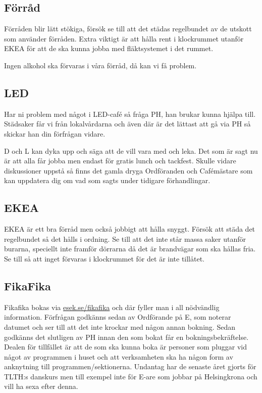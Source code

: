 \documentclass[10pt]{article}
\begin{document}
    \subsection{Förråd}
    
    Förråden blir lätt stökiga, försök se till att det städas regelbundet av de utskott som använder förråden. Extra viktigt är att hålla rent i klockrummet utanför EKEA för att de ska kunna jobba med fläktsystemet i det rummet.
    
    Ingen alkohol ska förvaras i våra förråd, då kan vi få problem.

    \subsection{LED}
    
    Har ni problem med något i LED-café så fråga PH, han brukar kunna hjälpa till. Städsaker får vi från lokalvårdarna och även där är det lättast att gå via PH så skickar han din förfrågan vidare.
    
    D och L kan dyka upp och säga att de vill vara med och leka. Det som är sagt nu är att alla får jobba men endast för gratis lunch och tackfest. Skulle vidare diskussioner uppstå så finns det gamla dryga Ordföranden och Cafémästare som kan uppdatera dig om vad som sagts under tidigare förhandlingar.
    
    \subsection{EKEA}
    
    EKEA är ett bra förråd men också jobbigt att hålla snyggt. Försök att städa det regelbundet så det hålls i ordning. Se till att det inte står massa saker utanför burarna, speciellt inte framför dörrarna då det är brandvägar som ska hållas fria. Se till så att inget förvaras i klockrummet för det är inte tillåtet.
    
    \subsection{FikaFika}
    
    Fikafika bokas via \url{esek.se/fikafika} och där fyller man i all nödvändlig information. Förfrågan godkänns sedan av Ordförande på E, som noterar datumet och ser till att det inte krockar med någon annan bokning. Sedan godkänns det slutligen av PH innan den som bokat får en bokningsbekräftelse. Dealen för tillfället är att de som ska kunna boka är personer som pluggar vid något av programmen i huset och att verksamheten ska ha någon form av anknytning till programmen/sektionerna. Undantag har de senaste året gjorts för TLTH:s danskurs men till exempel inte för E-are som jobbar på Helsingkrona och vill ha sexa efter denna.
    
\end{document}
